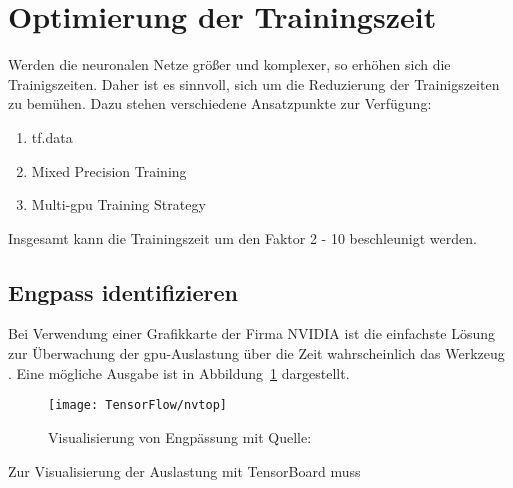 %
%


\section{Optimierung der Trainingszeit}


Werden die neuronalen Netze größer und komplexer, so erhöhen sich die Trainigszeiten. Daher ist es sinnvoll, sich um die Reduzierung der Trainigszeiten zu bemühen. Dazu stehen verschiedene Ansatzpunkte zur Verfügung:

\begin{enumerate}
    \item tf.data
    \item Mixed Precision Training
    \item Multi-\ac{gpu} Training Strategy
\end{enumerate}

Insgesamt kann die Trainingszeit um den Faktor 2 - 10 beschleunigt werden. \cite{KDnuggets.11.12.2020}

\subsection{Engpass identifizieren}

Bei Verwendung einer Grafikkarte der Firma NVIDIA ist die einfachste Lösung zur Überwachung der \ac{gpu}-Auslastung über die Zeit wahrscheinlich das Werkzeug . Eine mögliche Ausgabe ist in Abbildung~\ref{Fignvtop} dargestellt. 

\begin{figure}[H]
    \begin{center}
        \texttt{[image: TensorFlow/nvtop]}
        \caption{Visualisierung von Engpässung mit  Quelle:\cite{KDnuggets.11.12.2020}} 
        \label{Fignvtop}
    \end{center}
\end{figure}

Zur Visualisierung der Auslastung mit TensorBoard muss 

\medskip


